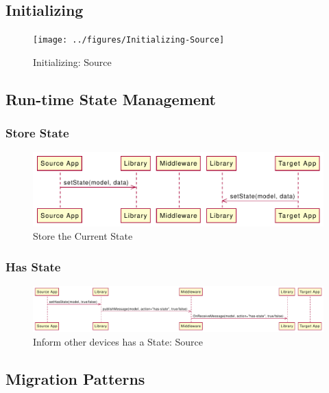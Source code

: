 \subsection{Initializing}
\begin{figure}
    \texttt{[image: ../figures/Initializing-Source]}
    \centering
    \caption{Initializing: Source}
    \label{fig:Initializing-Source}
\end{figure}

\subsection{Run-time State Management}
\subsubsection{Store State}
\begin{figure}
    \includegraphics[width=\linewidth]{../figures/Store-Current-State}
    \centering
    \caption{Store the Current State}
    \label{fig:Store-Current-State}
\end{figure}
\subsubsection{Has State}
\begin{figure}
    \includegraphics[width=\linewidth]{../figures/Inform-Devices-Has-State-Source}
    \centering
    \caption{Inform other devices has a State: Source}
    \label{fig:Inform-Devices-Has-State-Source}
\end{figure}

\subsection{Migration Patterns}
